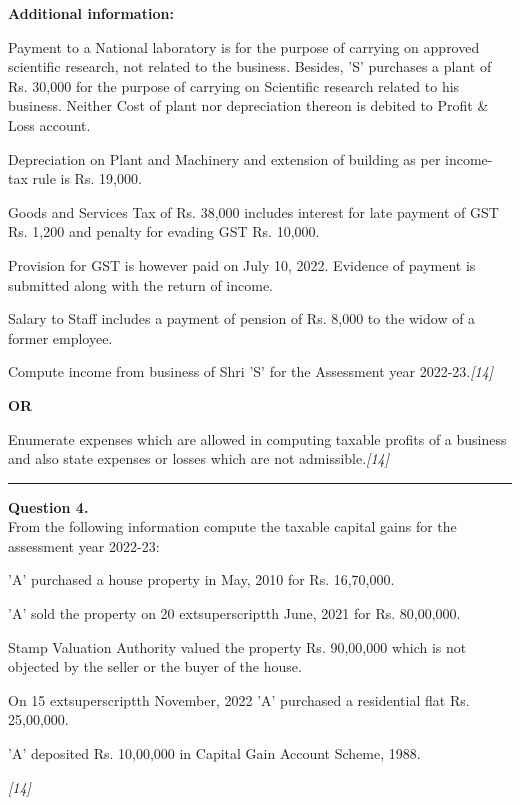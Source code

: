 \documentclass[11pt,a4paper]{article}
\newcommand{\pts}[1]{\hfill   \textit{[#1]}}
\begin{document}
\noindent   \textbf{Additional information:}

\begin{parts}
  \item Payment to a National laboratory is for the purpose of carrying on approved scientific research, not related to the business. Besides, 'S' purchases a plant of Rs. 30,000 for the purpose of carrying on Scientific research related to his business. Neither Cost of plant nor depreciation thereon is debited to Profit \& Loss account.
  \item Depreciation on Plant and Machinery and extension of building as per income-tax rule is Rs. 19,000.
  \item Goods and Services Tax of Rs. 38,000 includes interest for late payment of GST Rs. 1,200 and penalty for evading GST Rs. 10,000.
  \item Provision for GST is however paid on July 10, 2022. Evidence of payment is submitted along with the return of income.
  \item Salary to Staff includes a payment of pension of Rs. 8,000 to the widow of a former employee.
\end{parts}
Compute income from business of Shri 'S' for the Assessment year 2022-23.\pts{14}

\centerline{   \textbf{OR}}




\noindent Enumerate expenses which are allowed in computing taxable profits of a business and also state expenses or losses which are not admissible.\pts{14}

\medskip\rule{\linewidth}{0.2pt}




\noindent   \textbf{Question 4.} \\
From the following information compute the taxable capital gains for the assessment year 2022-23:

\begin{parts}
  \item 'A' purchased a house property in May, 2010 for Rs. 16,70,000.
  \item 'A' sold the property on 20 extsuperscript{th} June, 2021 for Rs. 80,00,000.
  \item Stamp Valuation Authority valued the property Rs. 90,00,000 which is not objected by the seller or the buyer of the house.
  \item On 15 extsuperscript{th} November, 2022 'A' purchased a residential flat Rs. 25,00,000.
  \item 'A' deposited Rs. 10,00,000 in Capital Gain Account Scheme, 1988.
\end{parts}\pts{14}
\end{document}

